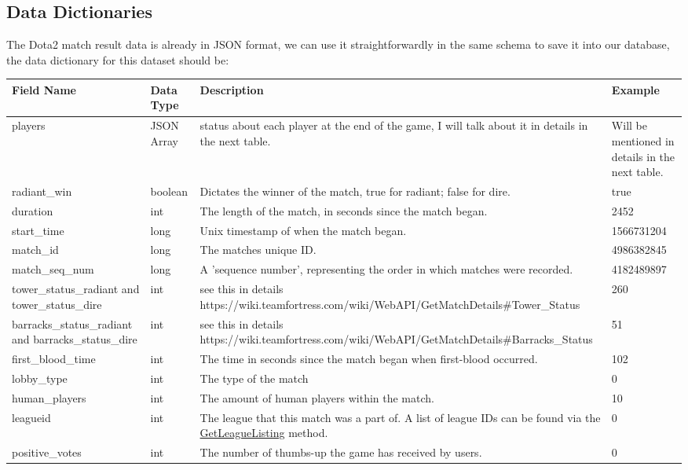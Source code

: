 \documentclass{article}
\begin{document}
\subsection{Data Dictionaries}
The Dota2 match result data is already in JSON format, we can use it straightforwardly in the same schema to save it into our database, the data dictionary for this dataset should be: \\
\begin{tabular}{|p{3cm}|p{2cm}|p{5cm}|p{3cm}|}
\hline
Field Name& Data Type& Description & Example\\
\hline
players& JSON Array & status about each player at the end of the game, I will talk about it in details in the next table.& Will be mentioned in details in the next table.
\\
\hline
radiant\_win& boolean & Dictates the winner of the match, true for radiant; false for dire.&true \\
\hline
duration & int & The length of the match, in seconds since the match began. & 2452 \\
\hline
start\_time & long & Unix timestamp of when the match began. & 1566731204 \\
\hline
match\_id & long & The matches unique ID. & 4986382845 \\
\hline
match\_seq\_num & long & A 'sequence number', representing the order in which matches were recorded. & 4182489897 \\
\hline
tower\_status\_radiant and tower\_status\_dire & int & see this in details https://wiki.teamfortress.com/wiki/WebAPI/GetMatchDetails\#Tower\_Status & 260 \\
\hline
barracks\_status\_radiant and barracks\_status\_dire & int & see this in details https://wiki.teamfortress.com/wiki/WebAPI/GetMatchDetails\#Barracks\_Status & 51 \\
\hline
first\_blood\_time & int & The time in seconds since the match began when first-blood occurred. & 102 \\
\hline
lobby\_type & int & The type of the match & 0 \\
\hline
human\_players & int & The amount of human players within the match. & 10 \\
\hline
leagueid & int & The league that this match was a part of. A list of league IDs can be found via the \href{https://wiki.teamfortress.com/wiki/WebAPI/GetLeagueListing}{GetLeagueListing} method.
 & 0 \\
\hline
positive\_votes & int & The number of thumbs-up the game has received by users. & 0 \\

\end{tabular}
\end{document}
